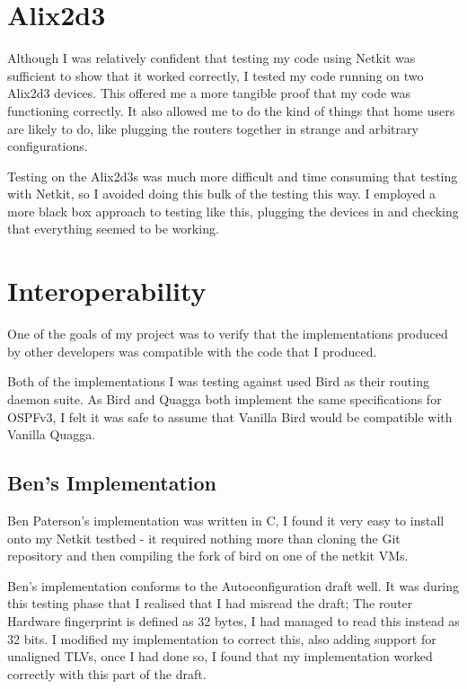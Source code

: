 \documentclass[12pt]{report}
\begin{document}
\section{Alix2d3}
Although I was relatively confident that testing my code using Netkit was
sufficient to show that it worked correctly, I tested my code running on two
Alix2d3 devices. This offered me a more tangible proof that my code was
functioning correctly. It also allowed me to do the kind of things that home users
are likely to do, like plugging the routers together in strange and arbitrary
configurations.

Testing on the Alix2d3s was much more difficult and time consuming that testing
with Netkit, so I avoided doing this bulk of the testing this way. I employed a
more black box approach to testing like this, plugging the devices in and
checking that everything seemed to be working. 

\section{Interoperability}
One of the goals of my project was to verify that the implementations produced
by other developers was compatible with the code that I produced. 

Both of the implementations I was testing against used Bird as their routing
daemon suite. As Bird and Quagga both implement the same specifications for
OSPFv3, I felt it was safe to assume that Vanilla Bird would be compatible with
Vanilla Quagga. 

\subsection{Ben's Implementation}
Ben Paterson's implementation was written in C, I found it very easy to install onto my
Netkit testbed - it required nothing more than cloning the Git repository and
then compiling the fork of bird on one of the netkit VMs. 

Ben's implementation conforms to the Autoconfiguration draft well. It was
during this testing phase that I realised that I had misread the draft; The
router Hardware fingerprint is defined as 32 bytes, I had managed to read this
instead as 32 bits. I modified my implementation to correct this, also adding
support for unaligned TLVs, once I had done so, I found that my implementation
worked correctly with this part of the draft.
\end{document}
